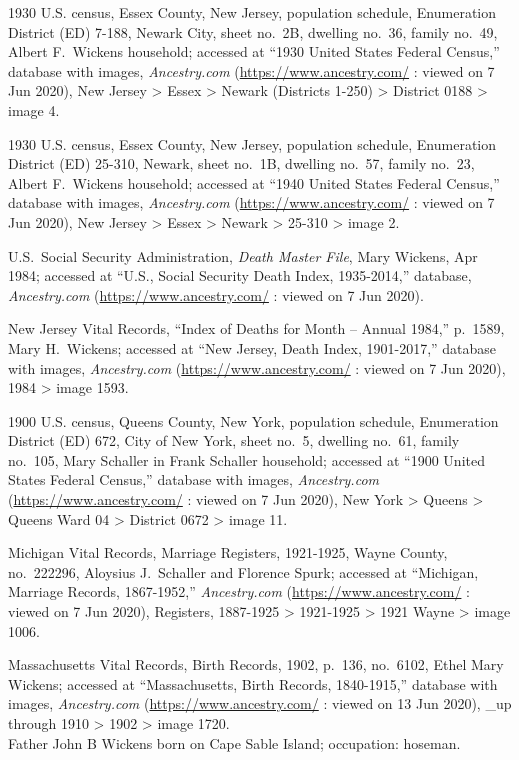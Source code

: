 \begin{thebibliography}{999}
	1930 U.S. census, Essex County, New Jersey, population schedule, Enumeration District (ED) 7-188, Newark City, sheet no.\ 2B, dwelling no.\ 36, family no.\ 49, Albert F.\ Wickens household; accessed at ``1930 United States Federal Census,'' database with images, \textit{Ancestry.com} (\url{https://www.ancestry.com/} : viewed on 7 Jun 2020), New Jersey > Essex > Newark (Districts 1-250) > District 0188 > image 4.
	
	1930 U.S. census, Essex County, New Jersey, population schedule, Enumeration District (ED) 25-310, Newark, sheet no.\ 1B, dwelling no.\ 57, family no.\ 23, Albert F.\ Wickens household; accessed at ``1940 United States Federal Census,'' database with images, \textit{Ancestry.com} (\url{https://www.ancestry.com/} : viewed on 7 Jun 2020), New Jersey > Essex > Newark > 25-310 > image 2.
	
	U.S.\ Social Security Administration, \textit{Death Master File}, Mary Wickens, Apr 1984; accessed at ``U.S., Social Security Death Index, 1935-2014,'' database, \textit{Ancestry.com} (\url{https://www.ancestry.com/} : viewed on 7 Jun 2020).
	
	New Jersey Vital Records, ``Index of Deaths for Month -- Annual 1984,'' p.\ 1589, Mary H.\ Wickens; accessed at ``New Jersey, Death Index, 1901-2017,'' database with images, \textit{Ancestry.com} (\url{https://www.ancestry.com/} : viewed on 7 Jun 2020), 1984 > image 1593.
	
	1900 U.S. census, Queens County, New York, population schedule, Enumeration District (ED) 672, City of New York, sheet no.\ 5, dwelling no.\ 61, family no.\ 105, Mary Schaller in Frank Schaller household; accessed at ``1900 United States Federal Census,'' database with images, \textit{Ancestry.com} (\url{https://www.ancestry.com/} : viewed on 7 Jun 2020), New York > Queens > Queens Ward 04 > District 0672 > image 11.
	
	Michigan Vital Records, Marriage Registers, 1921-1925, Wayne County, no.\ 222296, Aloysius J.\ Schaller and Florence Spurk; accessed at ``Michigan, Marriage Records, 1867-1952,'' \textit{Ancestry.com} (\url{https://www.ancestry.com/} : viewed on 7 Jun 2020), Registers, 1887-1925 > 1921-1925 > 1921 Wayne > image 1006.
	
	Massachusetts Vital Records, Birth Records, 1902, p.\ 136, no.\ 6102, Ethel Mary Wickens; accessed at ``Massachusetts, Birth Records, 1840-1915,'' database with images, \textit{Ancestry.com} (\url{https://www.ancestry.com/} : viewed on 13 Jun 2020), \_up through 1910 > 1902 > image 1720.\\
	Father John B Wickens born on Cape Sable Island; occupation: hoseman.
	

\end{thebibliography}
